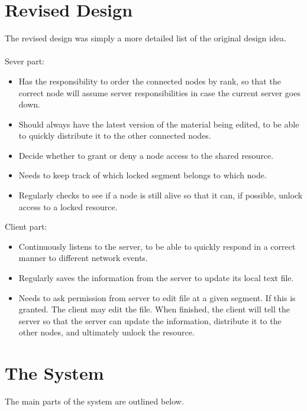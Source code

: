 \documentclass[12pt]{article}
\begin{document}
\section{Revised Design} %
\label{sec:revised_design}
The revised design was simply a more detailed list of the original design idea.
\\\\
Sever part:
\begin{itemize}
\item Has the responsibility to order the connected nodes by rank, so that the correct node will assume server responsibilities in case the current server goes down.
\item  Should always have the latest version of the material being edited, to be able to quickly distribute it to the other connected nodes.
\item Decide whether to grant or deny a node access to the shared resource.
\item Needs to keep track of which locked segment belongs to which node.
\item Regularly checks to see if a node is still alive so that it can, if possible, unlock access to a locked resource.
\end{itemize}
Client part:
\begin{itemize}
\item Continuously listens to the server, to be able to quickly respond in a correct manner to different network events. 
\item Regularly saves the information from the server to update its local text file. 
\item Needs to ask permission from server to edit file at a given segment. If this is granted. The client may edit the file. When finished, the client will tell the server so that the server can update the information, distribute it to the other nodes, and ultimately unlock the resource.
\end{itemize}



\section{The System} %
\label{sec:the_system}
The main parts of the system are outlined below.
\end{document}
